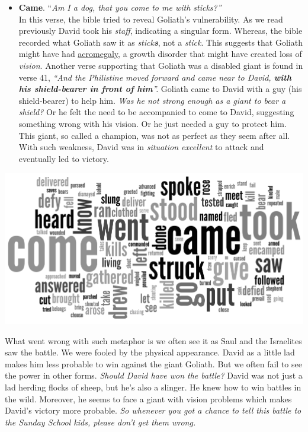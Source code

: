 \documentclass{article}
\begin{document}
\begin{multicols}{2}
\begin{itemize}
      \item \textbf{Came}. {``\small \textit{Am I a dog, that you come to me with sticks?''}}\\
           In this verse, the bible tried to reveal Goliath's vulnerability. 
           As we read previously David took his \textit{staff}, indicating a singular form. 
           Whereas, the bible recorded what Goliath saw it as \textit{stick\textbf{s}}, not a \textit{stick}.
           This suggests that Goliath might have had \href{http://en.wikipedia.org/wiki/Acromegaly}{acromegaly}, a growth disorder that might have created loss of \textit{vision}.
           Another verse supporting that Goliath was a disabled giant is found in verse 41, 
           \textit{``And the Philistine moved forward and came near to David, \textbf{with his shield-bearer in front of him}''.}
           Goliath came to David with a guy (his shield-bearer) to help him. 
           \textit{Was he not strong enough as a giant to bear a shield?} 
           Or he felt the need to be accompanied to come to David, suggesting something wrong with his vision. 
           Or he just needed a guy to protect him.
           This giant, so called a champion, was not as perfect as they seem after all.
           With such weakness, David was in \textit{situation excellent} to attack and eventually led to victory.\\
\end{itemize}



\begingroup
    \centering
    \includegraphics[width=.45\textwidth]{img/verb_ESV.png}
    \vspace{20pt}
\endgroup

What went wrong with such metaphor is we often see it as Saul and the Israelites saw the battle.
We were fooled by the physical appearance. 
David as a little lad makes him less probable to win against the giant Goliath.
But we often fail to see the power in other forms. 
\textit{Should David have won the battle?}
David was not just a lad herding flocks of sheep, but he's also a slinger.
He knew how to win battles in the wild.
Moreover, he seems to face a giant with vision problems which makes David's victory more probable. 
\textit{So whenever you got a chance to tell this battle to the Sunday School kids, please don't get them wrong.} 


\end{multicols}
\end{document}
